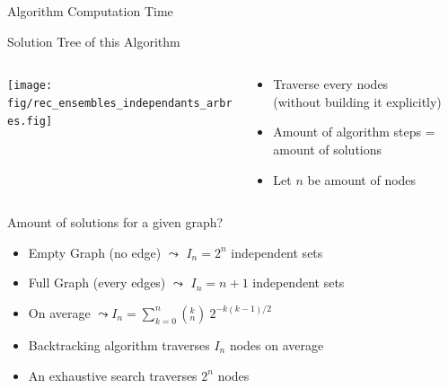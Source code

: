 \begin{frame}{Algorithm Computation Time}
  \begin{block}{Solution Tree of this Algorithm} \medskip
    \begin{columns}
      \begin{column}{.35\linewidth}
        \texttt{[image: fig/rec\_ensembles\_independants\_arbres.fig]}%
      \end{column}
      \begin{column}{.65\linewidth}
        \begin{itemize}
        \item Traverse every nodes\\
          {\small (without building it explicitly)}
        \item Amount of algorithm steps = amount of solutions
        \item Let $n$ be amount of nodes
        \end{itemize}
      \end{column}
    \end{columns}
  \end{block}

  \begin{block}{Amount of solutions for a given graph?}
    \begin{itemize}
    \item Empty Graph (no edge) $\leadsto$ $I_n=2^n$ independent sets
    \item Full Graph (every edges) $\leadsto$ $I_n=n+1$ independent sets
      \vspace{-.4\baselineskip}
    \item On average $\leadsto\displaystyle I_n=\sum^{n}_{k=0} (^k_n)\: 2^{-k(k-1)/2}$
    \end{itemize}    
  \end{block}\vspace{-.5\baselineskip}


  \begin{itemize}
  \item Backtracking algorithm traverses  $I_n$ nodes on average
  \item An exhaustive search traverses $2^n$ nodes
  \end{itemize}
\end{frame}
